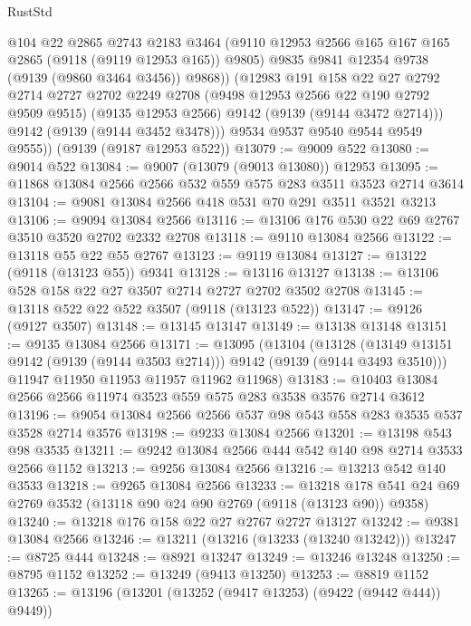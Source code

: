 \begin{lexlean}{RustStd}
\begin{coremodule}
              @104
              @22
              @2865
              @2743
              @2183
              @3464
              (@9110 @12953 @2566 @165 @167 @165 @2865 (@9118 (@9119 @12953 @165)) @9805)
              @9835
              @9841
              @12354
              @9738
              (@9139 (@9860 @3464 @3456))
              @9868))
          (@12983
            @191
            @158
            @22
            @27
            @2792
            @2714
            @2727
            @2702
            @2249
            @2708
            (@9498 @12953 @2566 @22 @190 @2792 @9509 @9515)
            (@9135 @12953 @2566)
            @9142
            (@9139 (@9144 @3472 @2714)))
          @9142
          (@9139 (@9144 @3452 @3478)))
        @9534
        @9537
        @9540
        @9544
        @9549
        @9555))
    (@9139 (@9187 @12953 @522))
@13079 := @9009 @522
@13080 := @9014 @522
@13084 := @9007 (@13079 (@9013 @13080)) @12953
@13095 := @11868 @13084 @2566 @2566 @532 @559 @575 @283 @3511 @3523 @2714 @3614
@13104 := @9081 @13084 @2566 @418 @531 @70 @291 @3511 @3521 @3213
@13106 := @9094 @13084 @2566
@13116 := @13106 @176 @530 @22 @69 @2767 @3510 @3520 @2702 @2332 @2708
@13118 := @9110 @13084 @2566
@13122 := @13118 @55 @22 @55 @2767
@13123 := @9119 @13084
@13127 := @13122 (@9118 (@13123 @55)) @9341
@13128 := @13116 @13127
@13138 := @13106 @528 @158 @22 @27 @3507 @2714 @2727 @2702 @3502 @2708
@13145 := @13118 @522 @22 @522 @3507 (@9118 (@13123 @522))
@13147 := @9126 (@9127 @3507)
@13148 := @13145 @13147
@13149 := @13138 @13148
@13151 := @9135 @13084 @2566
@13171 := @13095
    (@13104
      (@13128 (@13149 @13151 @9142 (@9139 (@9144 @3503 @2714))) @9142 (@9139 (@9144 @3493 @3510)))
      @11947
      @11950
      @11953
      @11957
      @11962
      @11968)
@13183 := @10403 @13084 @2566 @2566 @11974 @3523 @559 @575 @283 @3538 @3576 @2714 @3612
@13196 := @9054 @13084 @2566 @2566 @537 @98 @543 @558 @283 @3535 @537 @3528 @2714 @3576
@13198 := @9233 @13084 @2566
@13201 := @13198 @543 @98 @3535
@13211 := @9242 @13084 @2566 @444 @542 @140 @98 @2714 @3533 @2566 @1152
@13213 := @9256 @13084 @2566
@13216 := @13213 @542 @140 @3533
@13218 := @9265 @13084 @2566
@13233 := @13218 @178 @541 @24 @69 @2769 @3532 (@13118 @90 @24 @90 @2769 (@9118 (@13123 @90)) @9358)
@13240 := @13218 @176 @158 @22 @27 @2767 @2727 @13127
@13242 := @9381 @13084 @2566
@13246 := @13211 (@13216 (@13233 (@13240 @13242)))
@13247 := @8725 @444
@13248 := @8921 @13247
@13249 := @13246 @13248
@13250 := @8795 @1152
@13252 := @13249 (@9413 @13250)
@13253 := @8819 @1152
@13265 := @13196
    (@13201 (@13252 (@9417 @13253) (@9422 (@9442 @444)) @9449))

\end{coremodule}
\end{lexlean}
